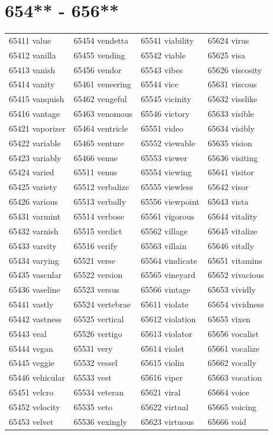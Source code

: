 \documentclass[10pt, oneside]{book}
\begin{document}
\begin{table}
	\centering
	\section*{654** - 656**}
	\begin{tabular}{l l l l}
65411 value &65454 vendetta &65541 viability &65624 virus\\
65412 vanilla &65455 vending &65542 viable &65625 visa\\
65413 vanish &65456 vendor &65543 vibes &65626 viscosity\\
65414 vanity &65461 veneering &65544 vice &65631 viscous\\
65415 vanquish &65462 vengeful &65545 vicinity &65632 viselike\\
65416 vantage &65463 venomous &65546 victory &65633 visible\\
65421 vaporizer &65464 ventricle &65551 video &65634 visibly\\
65422 variable &65465 venture &65552 viewable &65635 vision\\
65423 variably &65466 venue &65553 viewer &65636 visiting\\
65424 varied &65511 venus &65554 viewing &65641 visitor\\
65425 variety &65512 verbalize &65555 viewless &65642 visor\\
65426 various &65513 verbally &65556 viewpoint &65643 vista\\
65431 varmint &65514 verbose &65561 vigorous &65644 vitality\\
65432 varnish &65515 verdict &65562 village &65645 vitalize\\
65433 varsity &65516 verify &65563 villain &65646 vitally\\
65434 varying &65521 verse &65564 vindicate &65651 vitamins\\
65435 vascular &65522 version &65565 vineyard &65652 vivacious\\
65436 vaseline &65523 versus &65566 vintage &65653 vividly\\
65441 vastly &65524 vertebrae &65611 violate &65654 vividness\\
65442 vastness &65525 vertical &65612 violation &65655 vixen\\
65443 veal &65526 vertigo &65613 violator &65656 vocalist\\
65444 vegan &65531 very &65614 violet &65661 vocalize\\
65445 veggie &65532 vessel &65615 violin &65662 vocally\\
65446 vehicular &65533 vest &65616 viper &65663 vocation\\
65451 velcro &65534 veteran &65621 viral &65664 voice\\
65452 velocity &65535 veto &65622 virtual &65665 voicing\\
65453 velvet &65536 vexingly &65623 virtuous &65666 void\\
	\end{tabular}
 \end{table}
\clearpage
\end{document}
